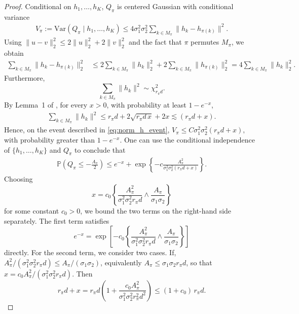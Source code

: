 \documentclass[10pt]{article}
\begin{document}
\begin{proof}
Conditional on $h_1,\ldots,h_K$, $Q_\pi$ is centered Gaussian with conditional variance 
\begin{align} 
V_\pi := \mathrm{Var}\left( Q_\pi\mid h_1,\ldots,h_K \right) \le  4\sigma_1^2\sigma_2^2 \sum_{k\in M_\pi} \|h_k-h_{\pi(k)}\|^2. 
\end{align} 
Using $\|u-v\|^2_2\le2\|u\|^2_2+2\|v\|^2_2$ and the fact that $\pi$ permutes $M_\pi$, we obtain 
\begin{align} 
\sum_{k\in M_\pi} \|h_k-h_{\pi(k)}\|^2_2 &\le 2\sum_{k\in M_\pi}\|h_k\|^2_2 + 2\sum_{k\in M_\pi}\|h_{\pi(k)}\|^2_2= 4\sum_{k\in M_\pi}\|h_k\|^2_2. \end{align}
Furthermore, 
\[ 
\sum_{k\in M_\pi}\|h_k\|^2 \sim \chi^2_{r_\pi d}. 
\] 
By Lemma~1 of \cite{laurent2000adaptive}, for every $x>0$, with probability at least $1-e^{-x}$, 
\begin{align} 
\label{eq:norm_h_event}
\sum_{k\in M_\pi}\|h_k\|^2 \le r_\pi d+2\sqrt{r_\pi d\,x}+2x \lesssim (r_\pi d+x). 
\end{align}
Hence, on the event described in \eqref{eq:norm_h_event}, $V_\pi \le C\sigma_1^2\sigma_2^2(r_\pi d+x),$ with probability greater than $1-e^{-x}$. 
One can use the conditional independence of $\{h_1,\ldots,h_K\}$ and $Q_\pi$ to conclude that 
\begin{align} 
\mathbb P\left( Q_\pi\le-\frac{A_\pi}{2} \right) \le e^{-x} + \exp\left\{ -c\frac{A_\pi^2} {\sigma_1^2\sigma_2^2(r_\pi d+x)} \right\}. 
\end{align} 
Choosing
\begin{equation*}
    x = c_0\left\{\frac{A_\pi^2}{\sigma_1^2\sigma_2^2 r_\pi d} \wedge \frac{A_\pi}{\sigma_1\sigma_2}\right\}
\end{equation*}
for some constant $c_0 > 0$, we bound the two terms on the right-hand side separately. The first term satisfies
\begin{equation*}
    e^{-x} = \exp\left[-c_0\left\{\frac{A_\pi^2}{\sigma_1^2\sigma_2^2 r_\pi d} \wedge \frac{A_\pi}{\sigma_1\sigma_2}\right\}\right]
\end{equation*}
directly. For the second term, we consider two cases.
If, $A_\pi^2/(\sigma_1^2\sigma_2^2 r_\pi d) \le A_\pi/(\sigma_1\sigma_2)$, equivalently $A_\pi \le \sigma_1\sigma_2 r_\pi d$, so that $x = c_0 A_\pi^2/(\sigma_1^2\sigma_2^2 r_\pi d)$. Then
\begin{equation*}
    r_\pi d + x = r_\pi d\left(1 + \frac{c_0 A_\pi^2}{\sigma_1^2\sigma_2^2 r_\pi^2 d^2}\right) \le (1+c_0)\, r_\pi d.
\end{equation*}

\end{proof}
\end{document}

